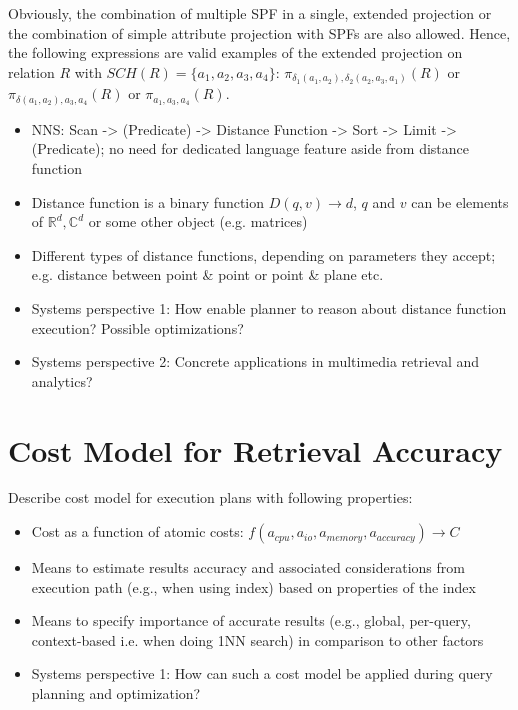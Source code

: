 Obviously, the combination of multiple SPF in a single, extended projection or the combination of simple attribute projection with SPFs are also allowed. Hence, the following expressions are valid examples of the extended projection on relation $R$ with $SCH(R) = \{ a_1, a_2, a_3, a_4 \}$: $\pi_{\delta_1(a_1,a_2), \delta_2(a_2,a_3,a_1)}(R)$ or $\pi_{\delta(a_1,a_2), a_3, a_4}(R)$ or $\pi_{a_1, a_3, a_4}(R)$.


\begin{itemize}
    \item NNS: Scan -> (Predicate) -> Distance Function -> Sort -> Limit -> (Predicate); no need for dedicated language feature aside from distance function
    \item Distance function is a binary function $D(q,v) \longrightarrow d$, $q$ and $v$ can be elements of $\mathbb{R}^d,\mathbb{C}^d$ or some other object (e.g. matrices)
    \item Different types of distance functions, depending on parameters they accept; e.g. distance between point \& point or point \& plane etc.
    \item Systems perspective 1: How enable planner to reason about distance function execution? Possible optimizations?
    \item Systems perspective 2: Concrete applications in multimedia retrieval and analytics?
\end{itemize}

\section{Cost Model for Retrieval Accuracy}
Describe cost model for execution plans with following properties:

\begin{itemize}
    \item Cost as a function of atomic costs: $f(a_{cpu}, a_{io}, a_{memory}, a_{accuracy}) \longrightarrow C$
    \item Means to estimate results accuracy and associated considerations from execution path (e.g., when using index) based on properties of the index
    \item Means to specify importance of accurate results (e.g., global, per-query, context-based i.e. when doing 1NN search) in comparison to other factors
    \item Systems perspective 1: How can such a cost model be applied during query planning and optimization?
\end{itemize}

